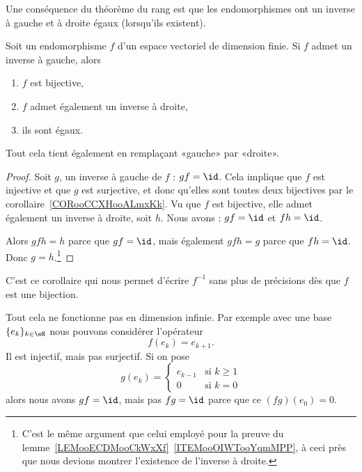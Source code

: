 Une conséquence du théorème du rang est que les endomorphismes ont un inverse à gauche et à droite égaux (lorsqu'ils existent).
\begin{corollary}
    Soit un endomorphisme \( f\) d'un espace vectoriel de dimension finie. Si \( f\) admet un inverse à gauche, alors
    \begin{enumerate}
        \item
            \( f\) est bijective,
        \item
            \( f\) admet également un inverse à droite,
        \item
            ils sont égaux.
    \end{enumerate}
    Tout cela tient également en remplaçant «gauche» par «droite».
\end{corollary}

\begin{proof}
    Soit \( g\), un inverse à gauche de \( f\) : \( gf=\id\). Cela implique que \( f\) est injective et que \( g\) est surjective, et donc qu'elles sont toutes deux bijectives par le corollaire~\ref{CORooCCXHooALmxKk}. Vu que \( f\) est bijective, elle admet également un inverse à droite, soit \( h\). Nous avons : \( gf=\id\) et \( fh=\id\).

    Alors \( gfh=h\) parce que \( gf=\id\), mais également \( gfh=g\) parce que \( fh=\id\). Donc \( g=h\).\footnote{C'est le même argument que celui employé pour la preuve du lemme~\ref{LEMooECDMooCkWxXf}~\ref{ITEMooOIWTooYqmMPP}, à ceci près que nous devions montrer l'existence de l'inverse à droite.}
\end{proof}
C'est ce corollaire qui nous permet d'écrire \( f^{-1}\) sans plus de précisions dès que \( f\) est une bijection.

\begin{example}
    Tout cela ne fonctionne pas en dimension infinie. Par exemple avec une base \( \{ e_k \}_{k\in \eN}\) nous pouvons considérer l'opérateur
    \begin{equation}
        f(e_k)=e_{k+1}.
    \end{equation}
    Il est injectif, mais pas surjectif. Si on pose
    \begin{equation}
        g(e_k)=\begin{cases}
            e_{k-1}    &   \text{si } k\geq 1\\
            0    &    \text{si } k=0
        \end{cases}
    \end{equation}
    alors nous avons \( gf=\id\), mais pas \( fg=\id\) parce que ce \( (fg)(e_0)=0\).
\end{example}


